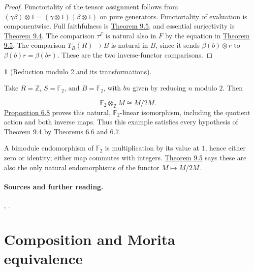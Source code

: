 \documentclass[11pt,a4paper]{article}
\newcommand{\mathheading}{}
\theoremstyle{plain}
\theoremstyle{definition}
\newtheorem*{definitionstatement}{\mathheading}
\newenvironment{mathdefinition}[3]{\renewcommand{\mathheading}{#1 #2}\begin{definitionstatement}[#3]}{\end{definitionstatement}}
\begin{document}
\begin{proof}

Functoriality of the tensor assignment follows from \((\gamma\beta)\otimes1=(\gamma\otimes1)(\beta\otimes1)\) on pure generators. Functoriality of evaluation is componentwise. Full faithfulness is \hyperref[env-9-5]{Theorem 9.5}, and essential surjectivity is \hyperref[env-9-4]{Theorem 9.4}. The comparison \(\tau^F\) is natural also in \(F\) by the equation in \hyperref[env-9-5]{Theorem 9.5}. The comparison \(T_B(R)\to B\) is natural in \(B\), since it sends \(\beta(b)\otimes r\) to \(\beta(b)r=\beta(br)\). These are the two inverse-functor comparisons.


\end{proof}
 
\begin{mathdefinition}{Example}{9.7}{Reduction modulo 2 and its transformations}
\label{env-9-7}

Take \(R=\mathbb Z\), \(S=\mathbb F_2\), and \(B=\mathbb F_2\), with \(b n\) given by reducing \(n\) modulo \(2\). Then

 \[\mathbb F_2\otimes_{\mathbb Z}M\cong M/2M.\] 
\hyperref[env-6-8]{Proposition 6.8} proves this natural, \(\mathbb F_2\)-linear isomorphism, including the quotient action and both inverse maps. Thus this example satisfies every hypothesis of \hyperref[env-9-4]{Theorem 9.4} by Theorems 6.6 and 6.7.

 
A bimodule endomorphism of \(\mathbb F_2\) is multiplication by its value at \(1\), hence either zero or identity; either map commutes with integers. \hyperref[env-9-5]{Theorem 9.5} says these are also the only natural endomorphisms of the functor \(M\mapsto M/2M\).


\par{}\par

\end{mathdefinition}
 
\paragraph{Sources and further reading.}
\cite[\S\S3.4 and 3.10]{crawley}, \cite{watts}.

\section{Composition and Morita equivalence}
\label{chapter-10}
  
\end{document}
